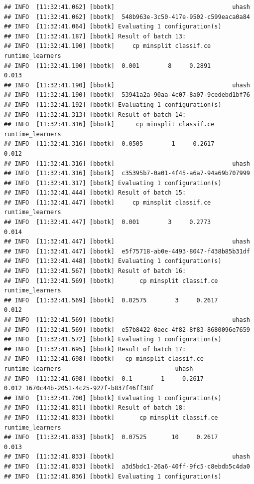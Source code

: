 \documentclass[
]{scrbook}
\begin{document}
\begin{verbatim}
## INFO  [11:32:41.062] [bbotk]                                 uhash 
## INFO  [11:32:41.062] [bbotk]  548b963e-3c50-417e-9502-c599eaca0a84 
## INFO  [11:32:41.064] [bbotk] Evaluating 1 configuration(s) 
## INFO  [11:32:41.187] [bbotk] Result of batch 13: 
## INFO  [11:32:41.190] [bbotk]     cp minsplit classif.ce runtime_learners 
## INFO  [11:32:41.190] [bbotk]  0.001        8     0.2891            0.013 
## INFO  [11:32:41.190] [bbotk]                                 uhash 
## INFO  [11:32:41.190] [bbotk]  53941a2a-90aa-4c07-8a07-9cedebd1bf76 
## INFO  [11:32:41.192] [bbotk] Evaluating 1 configuration(s) 
## INFO  [11:32:41.313] [bbotk] Result of batch 14: 
## INFO  [11:32:41.316] [bbotk]      cp minsplit classif.ce runtime_learners 
## INFO  [11:32:41.316] [bbotk]  0.0505        1     0.2617            0.012 
## INFO  [11:32:41.316] [bbotk]                                 uhash 
## INFO  [11:32:41.316] [bbotk]  c35395b7-0a01-4f45-a6a7-94a69b707999 
## INFO  [11:32:41.317] [bbotk] Evaluating 1 configuration(s) 
## INFO  [11:32:41.444] [bbotk] Result of batch 15: 
## INFO  [11:32:41.447] [bbotk]     cp minsplit classif.ce runtime_learners 
## INFO  [11:32:41.447] [bbotk]  0.001        3     0.2773            0.014 
## INFO  [11:32:41.447] [bbotk]                                 uhash 
## INFO  [11:32:41.447] [bbotk]  e5f75718-ab0e-4493-8047-f438b85b31df 
## INFO  [11:32:41.448] [bbotk] Evaluating 1 configuration(s) 
## INFO  [11:32:41.567] [bbotk] Result of batch 16: 
## INFO  [11:32:41.569] [bbotk]       cp minsplit classif.ce runtime_learners 
## INFO  [11:32:41.569] [bbotk]  0.02575        3     0.2617            0.012 
## INFO  [11:32:41.569] [bbotk]                                 uhash 
## INFO  [11:32:41.569] [bbotk]  e57b8422-0aec-4f82-8f83-8680096e7659 
## INFO  [11:32:41.572] [bbotk] Evaluating 1 configuration(s) 
## INFO  [11:32:41.695] [bbotk] Result of batch 17: 
## INFO  [11:32:41.698] [bbotk]   cp minsplit classif.ce runtime_learners                                uhash 
## INFO  [11:32:41.698] [bbotk]  0.1        1     0.2617            0.012 1670c44b-2051-4c25-927f-b837f46ff38f 
## INFO  [11:32:41.700] [bbotk] Evaluating 1 configuration(s) 
## INFO  [11:32:41.831] [bbotk] Result of batch 18: 
## INFO  [11:32:41.833] [bbotk]       cp minsplit classif.ce runtime_learners 
## INFO  [11:32:41.833] [bbotk]  0.07525       10     0.2617            0.013 
## INFO  [11:32:41.833] [bbotk]                                 uhash 
## INFO  [11:32:41.833] [bbotk]  a3d5bdc1-26a6-40ff-9fc5-c8ebdb5c4da0 
## INFO  [11:32:41.836] [bbotk] Evaluating 1 configuration(s) 

\end{verbatim}
\end{document}
